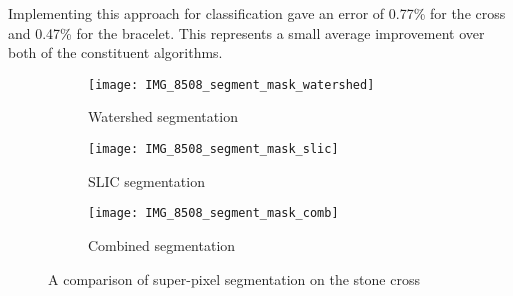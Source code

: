 \documentclass[12pt]{IIBproject}
\begin{document}
Implementing this approach for classification gave an error of 0.77\% for the cross and 0.47\% for the bracelet. This represents a small average improvement over both of the constituent algorithms.

 \begin{figure}[H]
\centering
\begin{subfigure}{.5\textwidth}
  \centering
  \texttt{[image: IMG\_8508\_segment\_mask\_watershed]}
  \caption{Watershed segmentation}
  \label{fig:sub2}
\end{subfigure}
\begin{subfigure}{.5\textwidth}
  \centering
  \texttt{[image: IMG\_8508\_segment\_mask\_slic]}
  \caption{SLIC segmentation}
  \label{fig:sub1}
\end{subfigure}%
\begin{subfigure}{.5\textwidth}
  \centering
  \texttt{[image: IMG\_8508\_segment\_mask\_comb]}
  \caption{Combined segmentation}
  \label{fig:sub1}
\end{subfigure}%


\caption{A comparison of super-pixel segmentation on the stone cross}
\label{fig:test}
\end{figure}
\end{document}
